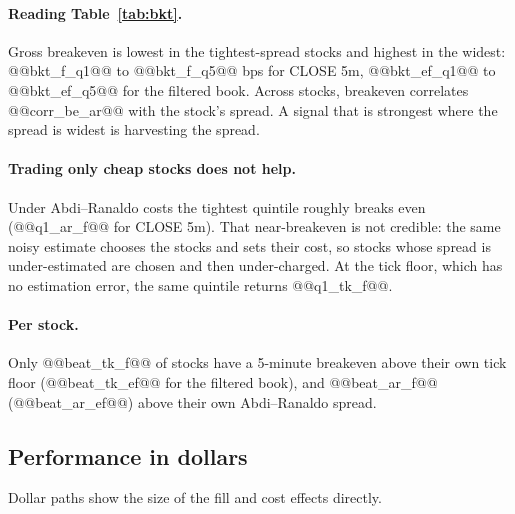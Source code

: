 \documentclass[11pt,a4paper]{article}
\begin{document}
\paragraph{Reading Table~\ref{tab:bkt}.} Gross breakeven is lowest in the tightest-spread stocks and
highest in the widest: @@bkt_f_q1@@ to @@bkt_f_q5@@ bps for CLOSE 5m, @@bkt_ef_q1@@ to @@bkt_ef_q5@@ for the
filtered book. Across stocks, breakeven correlates @@corr_be_ar@@ with the stock's spread. A signal that is
strongest where the spread is widest is harvesting the spread.

\paragraph{Trading only cheap stocks does not help.} Under Abdi--Ranaldo costs the tightest quintile
roughly breaks even (@@q1_ar_f@@ for CLOSE 5m). That near-breakeven is not credible: the same noisy estimate chooses the
stocks and sets their cost, so stocks whose spread is under-estimated are chosen and then under-charged.
At the tick floor, which has no estimation error, the same quintile returns @@q1_tk_f@@.

\paragraph{Per stock.} Only @@beat_tk_f@@ of stocks have a 5-minute breakeven above their own tick floor
(@@beat_tk_ef@@ for the filtered book), and @@beat_ar_f@@ (@@beat_ar_ef@@) above their own Abdi--Ranaldo spread.

\subsection{Performance in dollars}

Dollar paths show the size of the fill and cost effects directly.
\end{document}
